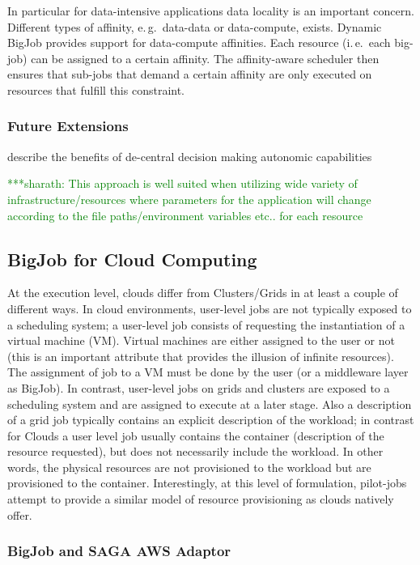 \documentclass[]{article}
\newcommand{\smnote}[1]{ {\textcolor{green} { ***sharath: #1 }}}
\newcommand{\smnote}[1]{}
\begin{document}
In particular for data-intensive applications data locality is an important
concern. Different types of affinity, e.\,g.\ data-data or data-compute, exists.
Dynamic BigJob provides support for data-compute affinities. Each resource
(i.\,e.\ each big-job) can be assigned to a certain affinity. The affinity-aware
scheduler then ensures that sub-jobs that demand a certain affinity are only
executed on resources that fulfill this constraint.


\subsubsection{Future Extensions}

describe the benefits of de-central decision making 
autonomic capabilities



\smnote{This approach is well suited when utilizing wide variety of
infrastructure/resources where parameters for the application will change
according to the file paths/environment variables etc.. for each resource}


\subsection{BigJob for Cloud Computing}

At the execution level, clouds differ from Clusters/Grids in at least a couple
of different ways. In cloud environments, user-level jobs are not typically
exposed to a scheduling system; a user-level job consists of requesting the
instantiation of a virtual machine (VM). Virtual machines are either assigned to
the user or not (this is an important attribute that provides the illusion of
infinite resources). The assignment of job to a VM must be done by the user (or
a middleware layer as BigJob). In contrast, user-level jobs on grids and 
clusters are exposed to a scheduling system and are
assigned to execute at a later stage. Also a description of a grid job typically
contains an explicit description of the workload; in contrast for Clouds a user
level job usually contains the container (description of the resource
requested), but does not necessarily include the workload. In other words, the
physical resources are not provisioned to the workload but are provisioned to
the container.  Interestingly, at this level of formulation, pilot-jobs attempt 
to provide a similar model of resource provisioning as clouds natively offer. 

\subsubsection{BigJob and SAGA AWS Adaptor}
\end{document}
